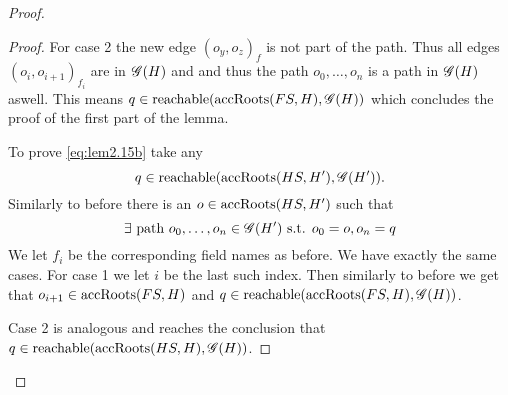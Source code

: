 \begin{proof}
\begin{description}
\begin{description}
\begin{description}
\begin{proof}
                For case 2 the new edge $(o_y, o_z)_f$ is not part of the path.
                Thus all edges $(o_i, o_{i+1})_{f_i}$ are in $\mathscr{G}(H)$ and and
                thus the path $o_0, \dots, o_n$ is a path in $\mathscr{G}(H)$ aswell.
                This means $q \in \mbox{$\mathrm{reachable}$}(\mbox{$\mathrm{accRoots}$}(FS, H), \mathscr{G}(H))$ which
                concludes the proof of the first part of the lemma.

                To prove \eqref{eq:lem2.15b} take any
                \begin{equation}
                  q \in \mbox{$\mathrm{reachable}$}(\mbox{$\mathrm{accRoots}$}(HS, H'), \mathscr{G}(H')).
                \end{equation}
                Similarly to before there is an $o \in \mbox{$\mathrm{accRoots}$}(HS,H')$ such
                that
                \begin{equation}
                  \exists \text{ path } o_0, \dots, o_n \in \mathscr{G}(H')
                  \text{ s.t. } o_0 = o, o_n = q
                \end{equation}
                We let $f_i$ be the corresponding field names as before.
                We have exactly the same cases. For case 1 we let $i$ be the last
                such index. Then similarly to before we get that $o_{i+1} \in
                \mbox{$\mathrm{accRoots}$}(FS, H)$ and $q \in \mbox{$\mathrm{reachable}$}(\mbox{$\mathrm{accRoots}$}(FS, H),
                \mathscr{G}(H))$.
                
                Case 2 is analogous and reaches the conclusion that $q \in
                \mbox{$\mathrm{reachable}$}(\mbox{$\mathrm{accRoots}$}(HS, H), \mathscr{G}(H))$.


\end{proof}
\end{description}
\end{description}
\end{description}
\end{proof}
